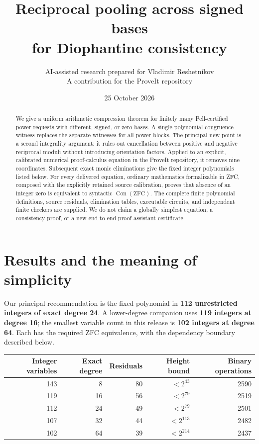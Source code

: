 \documentclass[10pt,letterpaper]{article}
\title{Reciprocal pooling across signed bases\\for Diophantine consistency}
\author{AI-assisted research prepared for Vladimir Reshetnikov\\\small A contribution for the ProveIt repository}
\date{25 October 2026}
\theoremstyle{remark}\newtheorem{remark}[theorem]{Remark}
\newcommand{\Con}{\operatorname{Con}}
\begin{document}
\maketitle
\begin{abstract}
We give a uniform arithmetic compression theorem for finitely many
Pell-certified power requests with different, signed, or zero bases.
A single polynomial congruence witness replaces the separate witnesses
for all power blocks. The principal new point is a second integrality
argument: it rules out cancellation between positive and negative
reciprocal moduli without introducing orientation factors. Applied to an
explicit, calibrated numerical proof-calculus equation in the ProveIt
repository, it removes nine coordinates. Subsequent exact monic
eliminations give the fixed integer polynomials listed below.
For every delivered equation, ordinary mathematics formalizable in ZFC,
composed with the explicitly retained source calibration, proves that
absence of an integer zero is equivalent to syntactic $\Con(\mathrm{ZFC})$.
The complete finite polynomial definitions, source residuals, elimination
tables, executable circuits, and independent finite checkers are supplied.
We do not claim a globally simplest equation, a consistency proof, or a
new end-to-end proof-assistant certificate.
\end{abstract}

\section{Results and the meaning of simplicity}

Our principal recommendation is the fixed polynomial in \textbf{112 unrestricted integers of exact degree 24}. A lower-degree companion uses \textbf{119 integers at degree 16}; the smallest variable count in this release is \textbf{102 integers at degree 64}. Each has the required ZFC equivalence, with the dependency boundary described below.

\begin{center}

\begin{tabular}{rrrrr}

\toprule

Integer variables & Exact degree & Residuals & Height bound & Binary operations\\

\midrule

143 & 8 & 80 & $<2^{43}$ & 2590\\

119 & 16 & 56 & $<2^{79}$ & 2519\\

112 & 24 & 49 & $<2^{79}$ & 2501\\

107 & 32 & 44 & $<2^{113}$ & 2482\\

102 & 64 & 39 & $<2^{214}$ & 2437\\

\bottomrule

\end{tabular}

\end{center}
\end{document}
